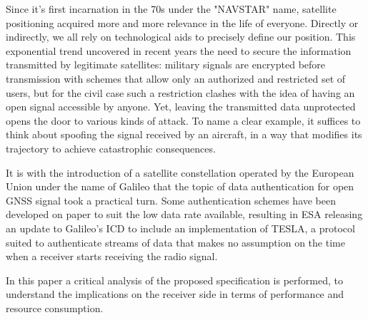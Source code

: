 
Since it's first incarnation in the 70s under the "NAVSTAR" name, satellite
positioning acquired more and more relevance in the life of everyone. Directly
or indirectly, we all rely on technological aids to precisely define our
position. This exponential trend uncovered in recent years the need to secure
the information transmitted by legitimate satellites: military signals are
encrypted before transmission with schemes that allow only an authorized and
restricted set of users, but for the civil case such a restriction clashes with
the idea of having an open signal accessible by anyone. Yet, leaving the
transmitted data unprotected opens the door to various kinds of attack. To name
a clear example, it suffices to think about spoofing the signal received by an
aircraft, in a way that modifies its trajectory to achieve catastrophic
consequences.

\vspace{\baselineskip}

It is with the introduction of a satellite constellation operated by the
European Union under the name of Galileo that the topic of data authentication
for open GNSS signal took a practical turn. Some authentication schemes have
been developed on paper to suit the low data rate available, resulting in ESA
releasing an update to Galileo's ICD to include an implementation of TESLA, a
protocol suited to authenticate streams of data that makes no assumption on the
time when a receiver starts receiving the radio signal.

In this paper a critical analysis of the proposed specification is performed, to
understand the implications on the receiver side in terms of performance and
resource consumption.
